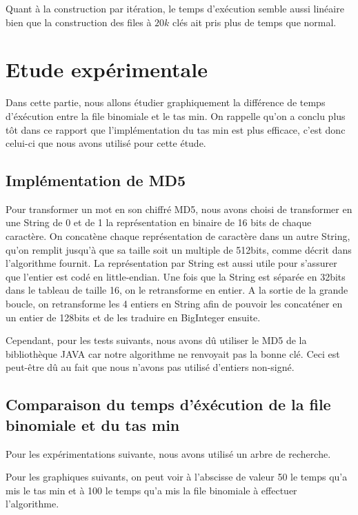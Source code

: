 \documentclass{article}
\begin{document}
Quant à la construction par itération, le temps d'exécution semble aussi linéaire bien que la construction des files à $20k$ clés ait pris plus de temps que normal.


\section{Etude expérimentale}

Dans cette partie, nous allons étudier graphiquement la différence de temps d'éxécution entre la file binomiale et le tas min. On rappelle qu'on a conclu plus tôt dans ce rapport que l'implémentation du tas min est plus efficace, c'est donc celui-ci que nous avons utilisé pour cette étude.

\subsection{Implémentation de MD5}
Pour transformer un mot en son chiffré MD5, nous avons choisi de transformer en une String de 0 et de 1 la représentation en binaire de 16 bits de chaque caractère. On concatène chaque représentation de caractère dans un autre String, qu’on remplit jusqu’à que sa taille soit un multiple de 512bits, comme décrit dans l’algorithme fournit. La représentation par String est aussi utile pour s’assurer que l’entier est codé en little-endian. Une fois que la String est séparée en 32bits dans le tableau de taille 16, on le retransforme en entier. A la sortie de la grande boucle, on retransforme les 4 entiers en String afin de pouvoir les concaténer en un entier de 128bits et de les traduire en BigInteger ensuite.

Cependant, pour les tests suivants, nous avons dû utiliser le MD5 de la bibliothèque JAVA car notre algorithme ne renvoyait pas la bonne clé. Ceci est peut-être dû au fait que nous n’avons pas utilisé d’entiers non-signé.

\subsection{Comparaison du temps d'éxécution de la file binomiale et du tas min}

Pour les expérimentations suivante, nous avons utilisé un arbre de recherche. %



Pour les graphiques suivants, on peut voir à l’abscisse de valeur 50 le temps qu’a mis le tas min et à 100  le temps qu’a mis la file binomiale à effectuer l’algorithme.
\end{document}
